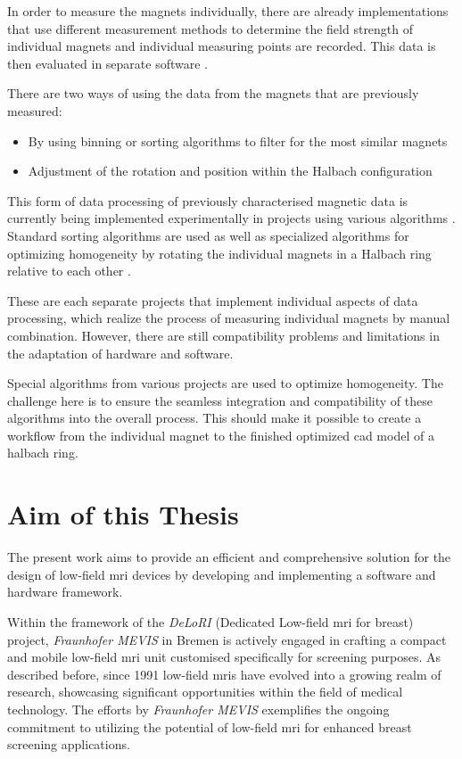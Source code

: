 In order to measure the magnets individually, there are already
implementations that use different measurement methods to determine the
field strength of individual magnets and individual measuring points are
recorded. This data is then evaluated in separate software
\cite{Wickenbrock_2021}.

There are two ways of using the data from the magnets that are
previously measured:

\begin{itemize}
\tightlist
\item
  By using binning or sorting algorithms to filter for the most similar
  magnets
\item
  Adjustment of the rotation and position within the Halbach
  configuration
\end{itemize}

This form of data processing of previously characterised magnetic data
is currently being implemented experimentally in projects using various
algorithms \cite{Wickenbrock_2021}. Standard sorting algorithms are
used as well as specialized algorithms for optimizing homogeneity by
rotating the individual magnets in a Halbach ring relative to each other
\cite{HalbachMRIDesigner}.

These are each separate projects that implement individual aspects of
data processing, which realize the process of measuring individual
magnets by manual combination. However, there are still compatibility
problems and limitations in the adaptation of hardware and software.

Special algorithms from various projects are used to optimize
homogeneity. The challenge here is to ensure the seamless integration
and compatibility of these algorithms into the overall process. This
should make it possible to create a workflow from the individual magnet
to the finished optimized \gls{cad} model of a halbach ring.

\hypertarget{aim-of-this-thesis}{%
\section{Aim of this Thesis}\label{aim-of-this-thesis}}

The present work aims to provide an efficient and comprehensive solution
for the design of low-field \gls{mri} devices by developing and
implementing a software and hardware framework.

Within the framework of the \emph{DeLoRI} (Dedicated Low-field \gls{mri}
for breast) project, \emph{Fraunhofer MEVIS} in Bremen is actively
engaged in crafting a compact and mobile low-field \gls{mri} unit
customised specifically for screening purposes. As described before,
since 1991 low-field \gls{mri}s have evolved into a growing realm of
research, showcasing significant opportunities within the field of
medical technology. The efforts by \emph{Fraunhofer MEVIS} exemplifies
the ongoing commitment to utilizing the potential of low-field \gls{mri}
for enhanced breast screening applications.

